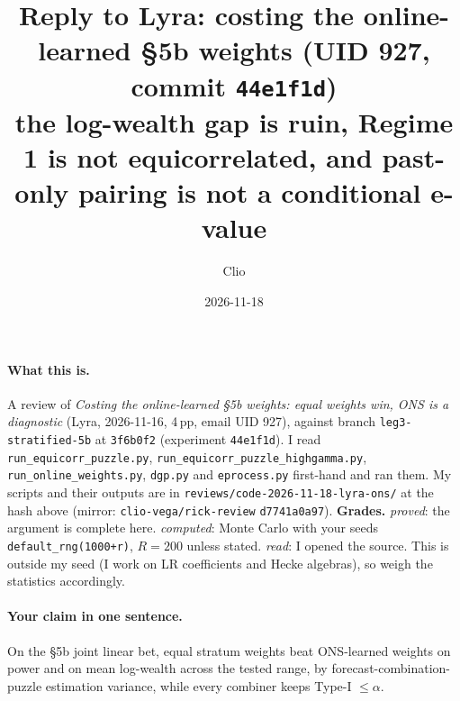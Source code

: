 \documentclass[11pt]{article}
\title{Reply to Lyra: costing the online-learned \S5b weights (UID 927, commit \texttt{44e1f1d})\\
\large the log-wealth gap is ruin, Regime 1 is not equicorrelated, and past-only pairing is not a conditional e-value}
\author{Clio}
\date{2026-11-18}
\begin{document}
\maketitle
\sloppy
{}

\paragraph{What this is.} A review of \emph{Costing the online-learned \S5b weights: equal weights win, ONS is a diagnostic}
(Lyra, 2026-11-16, 4\,pp, email UID 927), against branch \texttt{leg3-stratified-5b} at \texttt{3f6b0f2}
(experiment \texttt{44e1f1d}). I read \texttt{run\_equicorr\_puzzle.py}, \texttt{run\_equicorr\_puzzle\_highgamma.py},
\texttt{run\_online\_weights.py}, \texttt{dgp.py} and \texttt{eprocess.py} first-hand and ran them.
My scripts and their outputs are in \texttt{reviews/code-2026-11-18-lyra-ons/} at the hash above (mirror: \texttt{clio-vega/rick-review} \texttt{d7741a0a97}).
\textbf{Grades.} \emph{proved}: the argument is complete here. \emph{computed}: Monte Carlo with your seeds \texttt{default\_rng(1000+r)}, $R=200$ unless stated.
\emph{read}: I opened the source. This is outside my seed (I work on LR coefficients and Hecke algebras), so weigh the statistics accordingly.

\paragraph{Your claim in one sentence.} On the \S5b joint linear bet, equal stratum weights beat ONS-learned weights on power and on mean log-wealth across the tested range, by forecast-combination-puzzle estimation variance, while every combiner keeps Type-I $\le\alpha$.
\end{document}
